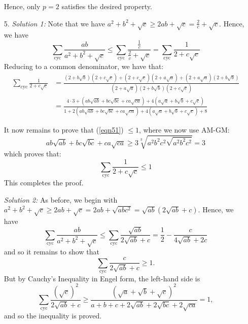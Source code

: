 \documentclass[a4paper, 12pt]{article}
\begin{document}
\begin{enumerate}
    Hence, only $p=2$ satisfies the desired property.
    

    \item[5.]  %
    \emph{Solution 1:} Note that we have $a^2 + b^2 + \sqrt{c} \geq 2ab + \sqrt{c} = \frac{2}{c} + \sqrt{c}$. Hence, we have
    $$ \sum_\textrm{cyc} \frac {ab}{a^2 + b^2 + \sqrt {c}} \leq \sum_\textrm{cyc} \frac{\frac{1}{c}}{\frac{2}{c} + \sqrt{c}} = \sum_\textrm{cyc} \frac{1}{2 + c\sqrt{c}} $$
    Reducing to a common denominator, we have that:
    \begin{align}
        \sum_\textrm{cyc} \frac{1}{2 + c\sqrt{c}} &= \frac{(2 + b \sqrt{b})(2 + c \sqrt{c}) + (2 + c \sqrt{c})(2 + a \sqrt{a}) + (2 + a \sqrt{a})(2 + b \sqrt{b})}{(2 + a \sqrt{a})(2 + b \sqrt{b})(2 + c \sqrt{c})} \nonumber \\
        &= \frac{4 \cdot 3 + (ab\sqrt{ab} + bc\sqrt{bc} + ca\sqrt{ca}) + 4(a\sqrt{a} + b\sqrt{b} + c\sqrt{c})}{1 + 2(ab\sqrt{ab} + bc\sqrt{bc} + ca\sqrt{ca}) + 4(a\sqrt{a} + b\sqrt{b} + c\sqrt{c}) + 8} \label{eqn51}
    \end{align} 
    
    It now remains to prove that (\ref{eqn51}) $ \leq 1$, where we now use AM-GM:
    $$  ab\sqrt {ab} + bc\sqrt {bc} + ca\sqrt {ca} \geq 3 \sqrt [3]{a^2b^2c^2\sqrt {a^2b^2c^2}} = 3 $$
    which proves that:
    $$ \sum_\textrm{cyc} \frac{1}{2 + c\sqrt{c}} \leq 1 $$
    This completes the proof.
    
	  \emph{Solution 2:} As before, we begin with $a^2 + b^2 + \sqrt{c} \geq 2ab + \sqrt{c} = 2ab + \sqrt{abc^2} = \sqrt{ab}\left(2\sqrt{ab}+c\right)$. Hence, we have
	    \[ \sum_\textrm{cyc} \frac {ab}{a^2 + b^2 + \sqrt {c}} \leq \sum_\textrm{cyc} \frac{\sqrt{ab}}{2\sqrt{ab}+c} = \frac{1}{2} - \frac{c}{4\sqrt{ab}+2c} \]
	  and so it remains to show that
	    \[ \sum_\textrm{cyc} \frac{c}{2\sqrt{ab}+c} \geq 1. \]
	  But by Cauchy's Inequality in Engel form, the left-hand side is
	    \[ \sum_\textrm{cyc} \frac{(\sqrt{c})^2}{2\sqrt{ab}+c} \geq \frac{\left(\sqrt{a}+\sqrt{b}+\sqrt{c}\right)^2}{a+b+c+2\sqrt{ab}+2\sqrt{bc}+2\sqrt{ca}} = 1, \]
	  and so the inequality is proved.
\end{enumerate}
\end{document}

